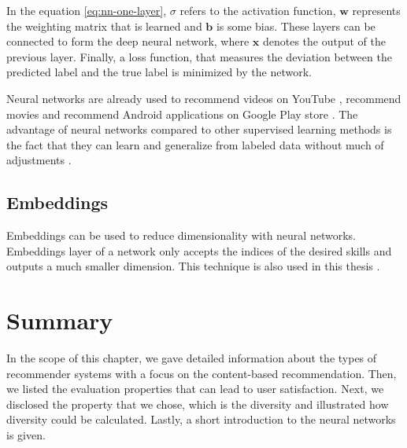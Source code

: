 In the equation \eqref{eq:nn-one-layer}, $\sigma$ refers to the activation function, $\boldsymbol{w}$ represents the weighting matrix that is learned and $\boldsymbol{b}$ is some bias. These layers can be connected to form the deep neural network, where $\boldsymbol{x}$ denotes the output of the previous layer. Finally, a loss function, that measures the deviation between the predicted label and the true label is minimized by the network.

Neural networks are already used to recommend videos on YouTube \cite{covington2016deep}, recommend movies \cite{christakou2007hybrid} and recommend Android applications on Google Play store \cite{cheng2016wide}. The advantage of neural networks compared to other supervised learning methods is the fact that they can learn and generalize from labeled data without much of adjustments \cite{maind2014research}.


\subsection{Embeddings}\label{research:embeddings}

Embeddings can be used to reduce dimensionality with neural networks. Embeddings layer of a network only accepts the indices of the desired skills and outputs a much smaller dimension. This technique is also used in this thesis \cite{gal2016theoretically}.





\section{Summary}


In the scope of this chapter, we gave detailed information about the types of recommender systems with a focus on the content-based recommendation. Then, we listed the evaluation properties that can lead to user satisfaction. Next, we disclosed the property that we chose, which is the diversity and illustrated how diversity could be calculated. Lastly, a short introduction to the neural networks is given.
